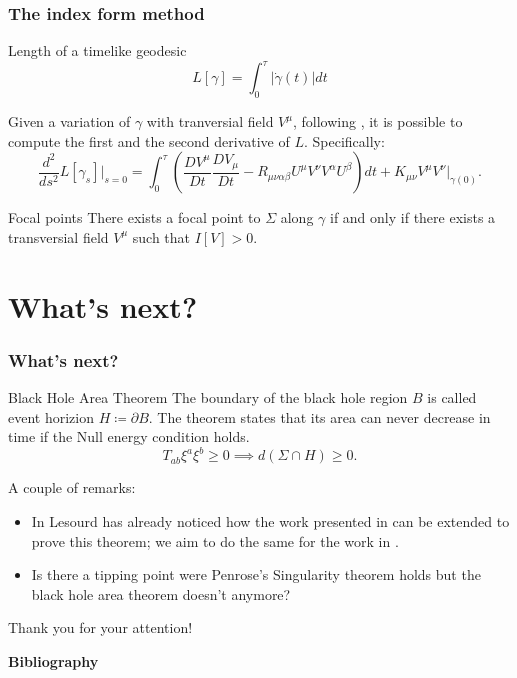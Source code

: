 \documentclass[]{beamer}
\begin{document}

\begin{frame}
	\frametitle{The index form method \cite{fewster2020new}}
	\begin{defblock}{Length of a timelike geodesic}
		\[
		L[\gamma] = \int_{0}^{\tau} |\dot{\gamma}(t)| dt
		\]
	\end{defblock}
	Given a variation of \(\gamma\) with tranversial field \(V^{\mu}\), following \cite{o1983semi}, it is possible to compute the first and the second derivative of \(L\). Specifically:
	{\small
		\[
	\frac{d^2}{ds^2}L[\gamma_s]\Bigg|_{s = 0} =\int_{0}^{\tau} \left(\frac{DV^{\mu}}{Dt} \frac{DV_{\mu}}{Dt} - R_{\mu\nu\alpha\beta}U^{\mu}V^{\nu}V^{\alpha}U^{\beta}\right) dt + K_{\mu\nu}V^{\mu}V^{\nu}|_{\gamma(0)}.
	\]}

	\begin{theoblock}{Focal points}
		There exists a focal point to \(\Sigma\) along \(\gamma\) if and only if there exists a transversial field \(V^{\mu}\) such that \(I[V] > 0\).
	\end{theoblock}
\end{frame}

\section{What's next?}
\begin{frame}
	\frametitle{What's next?}
	\begin{theoblock}{Black Hole Area Theorem}
		The boundary of the black hole region \(B\) is called event horizion \(H \coloneqq \partial B\). The theorem states that its area can never decrease in time if the Null energy condition holds.
		\[
		T_{ab}\xi^a\xi^b \ge 0 \implies d(\Sigma \cap H) \ge 0.
		\]
	\end{theoblock}
\pause
A couple of remarks:
\begin{itemize}
	\item<2-> In \cite{lesourd2018remark} Lesourd has already noticed how the work presented in \cite{fewster2011singularity} can be extended to prove this theorem; we aim to do the same for the work in \cite{fewster2020new}.
	\item<3-> Is there a tipping point were Penrose's Singularity theorem holds but the black hole area theorem doesn't anymore?
\end{itemize}
 
\end{frame}

\begin{frame}
	\centering
	\vskip 7pt
	{\Huge \textcolor{theorem}{Thank you for your attention!}}

	\vskip 3pt
	\textbf{Bibliography}
	\printbibliography
\end{frame}
\end{document}
